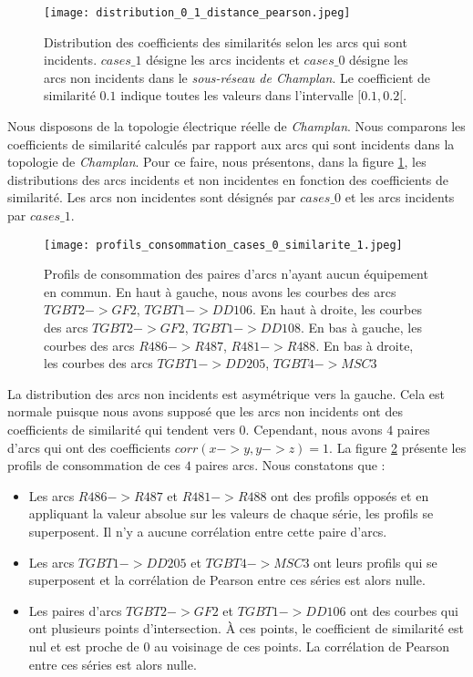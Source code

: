\begin{figure}[htb!] 
\centering
\texttt{[image: distribution\_0\_1\_distance\_pearson.jpeg]}
\caption{Distribution des coefficients des similarit\'es selon les arcs qui sont incidents.
$cases\_1$ d\'esigne les arcs incidents et $cases\_0$ d\'esigne les arcs non incidents dans le {\em sous-r\'eseau de Champlan}.
Le coefficient de similarit\'e $0.1$ indique toutes les valeurs dans l'intervalle $[0.1, 0.2[$.
}
\label{distribution_0_1_distance_pearson}
\end{figure}
Nous disposons de la topologie \'electrique r\'eelle de {\em Champlan}.
Nous comparons  les coefficients de similarit\'e  calcul\'es par rapport aux arcs qui sont incidents dans la topologie de {\em Champlan}.
Pour ce faire, nous pr\'esentons, dans la figure \ref{distribution_0_1_distance_pearson}, les distributions des arcs incidents et non incidentes  en fonction des coefficients de similarit\'e. Les arcs non incidentes sont d\'esign\'es par $cases\_0$ et les arcs incidents par $cases\_1$.
		\begin{figure}[htb!] 
		\centering
		\texttt{[image: profils\_consommation\_cases\_0\_similarite\_1.jpeg]}
		\caption{ Profils de consommation des paires d'arcs n'ayant aucun \'equipement en commun. 
		En haut \`a gauche, nous avons les courbes des arcs $TGBT2->GF2$, $TGBT1->DD106$. 
		En haut \`a droite, les courbes des arcs $TGBT2->GF2$, $TGBT1->DD108$. 
		En bas \`a gauche, les courbes des arcs $R486->R487$, $R481->R488$.
		En bas \`a droite,  les courbes des arcs  $TGBT1->DD205$, $TGBT4->MSC3$
		}
		\label{profils_consommation_cases_0_similarite_1}
		\end{figure}
	La distribution des arcs non incidents est asym\'etrique vers la gauche. Cela est normale puisque nous avons suppos\'e que les arcs non incidents ont des coefficients de similarit\'e qui tendent vers $0$. 
	Cependant, nous avons $4$ paires d'arcs qui ont des coefficients $corr(x->y,y->z) = 1$. La figure \ref{profils_consommation_cases_0_similarite_1} pr\'esente les profils de consommation de ces $4$ paires arcs. Nous constatons que :
	\begin{itemize}
		\item Les arcs $R486->R487$ et $R481->R488$ ont des profils oppos\'es et en appliquant la valeur absolue sur les valeurs de chaque s\'erie, les profils se superposent. Il n'y a aucune corr\'elation entre cette paire d'arcs. 
		\item Les arcs $TGBT1->DD205$ et $TGBT4->MSC3$ ont leurs profils qui se superposent et la corr\'elation de Pearson entre ces s\'eries est alors nulle.
		\item Les paires d'arcs $TGBT2->GF2$ et $TGBT1->DD106$ ont des courbes qui ont plusieurs points d'intersection. \`A ces points, le coefficient de similarit\'e est nul et est proche de $0$ au voisinage de ces points. La corr\'elation de Pearson entre ces s\'eries est alors nulle. 
	\end{itemize}

